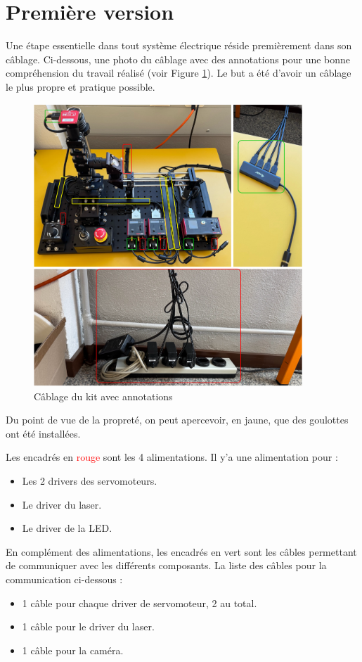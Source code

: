 \section{Première version}
Une étape essentielle dans tout système électrique réside premièrement dans son câblage. Ci-dessous, une photo du câblage avec des annotations pour une bonne compréhension du travail réalisé (voir Figure \ref{cablage_kit_annoté}). Le but a été d'avoir un câblage le plus propre et pratique possible.

\newpage
\begin{figure}[H]
    \begin{center}
        \includegraphics[width=0.9\textwidth]{assets/figures/Cablage_du_kit/Cablage_annote.png}
    \end{center}
    \caption{Câblage du kit avec annotations}
    \label{cablage_kit_annoté}
\end{figure}

Du point de vue de la propreté, on peut apercevoir, en \textcolor[RGB]{230, 230, 0}{jaune}, que des goulottes ont été installées.

Les encadrés en \textcolor{red}{rouge} sont les 4 alimentations. Il y'a une alimentation pour :
\begin{itemize}
    \item Les 2 drivers des servomoteurs.
    \item Le driver du laser.
    \item Le driver de la LED.
\end{itemize}

En complément des alimentations, les encadrés en \textcolor[RGB]{0, 201, 18}{vert} sont les câbles permettant de communiquer avec les différents composants. La liste des câbles pour la communication ci-dessous :
\begin{itemize}
    \item 1 câble pour chaque driver de servomoteur, 2 au total.
    \item 1 câble pour le driver du laser.
    \item 1 câble pour la caméra.
\end{itemize}
